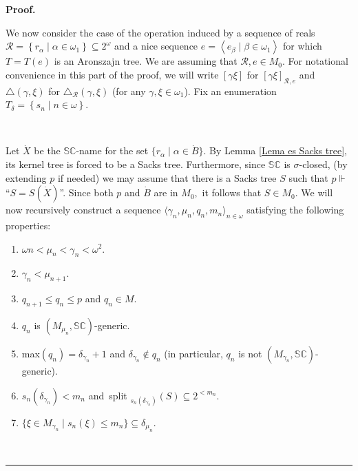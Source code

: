 \documentclass{article}
\newenvironment{proof}[1][Proof]{\noindent\textbf{#1.} }{\ \rule{0.5em}{0.5em}}
\begin{document}
\begin{proof}
\qquad\qquad\ \qquad\ \ \ \ 

We now consider the case of the operation induced by a sequence of reals
$\mathcal{R}=\left\{  r_{\alpha}\mid\alpha\in\omega_{1}\right\}
\subseteq2^{\omega}$ and a nice sequence $e=\left\langle e_{\beta}\mid\beta
\in\omega_{1}\right\rangle $ for which $T=T\left(  e\right)  $ is an Aronszajn
tree. We are assuming that $\mathcal{R},e\in M_{0}.$ For notational
convenience in this part of the proof, we will write $\left[  \gamma
\xi\right]  $ for $\left[  \gamma\xi\right]  _{\mathcal{R},e}$ and
$\triangle\left(  \gamma,\xi\right)  $ for $\triangle_{\mathcal{R}}\left(
\gamma,\xi\right)  $ (for any $\gamma,\xi\in\omega_{1}$). Fix an enumeration
$T_{\delta}=\left\{  s_{n}\mid n\in\omega\right\}  .$

\qquad\ \qquad\ \ \ \ \ \qquad\ \ \ \ 

Let $\dot{X}$ be the $\mathbb{SC}$-name for the set $\{r_{\alpha}\mid\alpha
\in\dot{B}\}.$ By Lemma \ref{Lema es Sacks tree}, its kernel tree is forced to
be a Sacks tree. Furthermore, since $\mathbb{SC}$ is $\sigma$-closed, (by
extending $p$ if needed) we may assume that there is a Sacks tree $S$ such
that $p\Vdash$\textquotedblleft$S=S(\dot{X})$\textquotedblright. Since both
$p$ and $\dot{B}$ are in $M_{0},$ it follows that $S\in M_{0}.$ We will now
recursively construct a sequence $\langle\gamma_{n},\mu_{n},q_{n},m_{n}%
\rangle_{n\in\omega}$ satisfying the following properties:

\begin{enumerate}
\item $\omega n<\mu_{n}<\gamma_{n}<\omega^{2}.$

\item $\gamma_{n}<\mu_{n+1}.$

\item $q_{n+1}\leq q_{n}\leq p$ and $q_{n}\in M.$

\item $q_{n}$ is $(M_{\mu_{n}},\mathbb{SC})$-generic.

\item \textsf{max}$\left(  q_{n}\right)  =\delta_{\gamma_{n}}+1$ and
$\delta_{\gamma_{n}}\notin q_{n}$ (in particular, $q_{n}$ is not
$(M_{\gamma_{n}},\mathbb{SC})$-generic).

\item $s_{n}\left(  \delta_{\gamma_{n}}\right)  <m_{n}$ and\ \textsf{split}%
$_{s_{n}\left(  \delta_{\gamma_{n}}\right)  }\left(  S\right)  \subseteq
2^{<m_{n}}.$

\item $\{\xi\in M_{\gamma_{n}}\mid s_{n}\left(  \xi\right)  \leq
m_{n}\}\subseteq\delta_{\mu_{n}}.$
\end{enumerate}


\end{proof}
\end{document}
